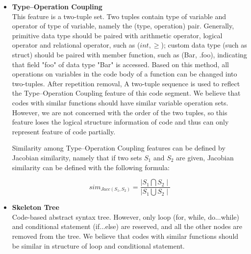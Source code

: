 \begin{itemize}
	\item \textbf{Type–Operation Coupling} \\
	This feature is a two-tuple set. Two tuples contain type of variable and operator of type of variable, namely the (type, operation) pair. Generally, primitive data type should be paired with arithmetic operator, logical operator and relational operator, such as ($int, \geq$); custom data type (such as struct) should be paired with member function, such as (Bar, .foo), indicating that field "foo" of data type "Bar" is accessed. Based on this method, all operations on variables in the code body of a function can be changed into two-tuples. After repetition removal, A two-tuple sequence is used to reflect the Type–Operation Coupling feature of this code segment. We believe that codes with similar functions should have similar variable operation sets. However, we are not concerned with the order of the two tuples, so this feature loses the logical structure information of code and thus can only represent feature of code partially.
	
	
	Similarity among Type–Operation Coupling features can be defined by Jacobian similarity, namely that if two sets $S_1$ and $S_2$ are given, Jacobian similarity can be defined with the following formula:
	
	
	\begin{equation}
	sim_{Jacc(S_{1}, S_{2})}=\frac{\mid S_{1}\bigcap S_{2}\mid}{\mid S_{1}\bigcup S_{2}\mid}
	\end{equation}
	
	\item \textbf{Skeleton Tree} \\
	Code-based abstract syntax tree. However, only loop (for, while, do...while) and conditional statement (if...else) are reserved, and all the other nodes are removed from the tree. We believe that codes with similar functions should be similar in structure of loop and conditional statement.
	

\end{itemize}
